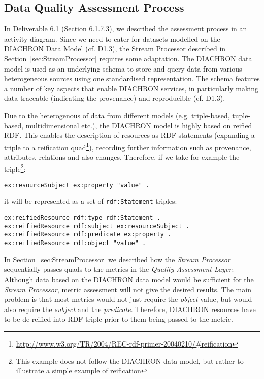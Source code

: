 
\subsection{Data Quality Assessment Process}
\label{sec:DQAssessment} 
In Deliverable 6.1 (Section 6.1.7.3), we described the assessment process in an activity diagram.
Since we need to cater for datasets modelled on the DIACHRON Data Model (cf. D1.3), the Stream Processor described in Section~\ref{sec:StreamProcessor} requires some adaptation.
The DIACHRON data model is used as an underlying schema to store and query data from various heterogeneous sources using one standardised representation.
The schema features a number of key aspects that enable DIACHRON services, in particularly making data traceable (indicating the provenance) and reproducible (cf. D1.3).

Due to the heterogenous of data from different models (e.g. triple-based, tuple-based, multidimensional etc.), the DIACHRON model is highly based on reified RDF.
This enables the description of resources as RDF statements (expanding a triple to a reification quad\footnote{\url{http://www.w3.org/TR/2004/REC-rdf-primer-20040210/#reification}}), recording further information such as provenance, attributes, relations and also changes.
Therefore, if we take for example the triple\footnote{This example does not follow the DIACHRON data model, but rather to illustrate a simple example of reification}:
\begin{lstlisting}[language=N3]
ex:resourceSubject ex:property "value" .
\end{lstlisting}
it will be represented as a set of \texttt{rdf:Statement} triples:
\begin{lstlisting}[language=N3]
ex:reifiedResource rdf:type rdf:Statement .
ex:reifiedResource rdf:subject ex:resourceSubject .
ex:reifiedResource rdf:predicate ex:property .
ex:reifiedResource rdf:object "value" .
\end{lstlisting}

In Section~\ref{sec:StreamProcessor} we described how the \emph{Stream Processor} sequentially passes quads to the metrics in the \emph{Quality Assessment Layer}.
Although data based on the DIACHRON data model would be sufficient for the \emph{Stream Processor}, metric assessment will not give the desired results.
The main problem is that most metrics would not just require the \emph{object} value, but would also require the \emph{subject} and the \emph{predicate}.
Therefore, DIACHRON resources have to be de-reified into RDF triple prior to them being passed to the metric.

